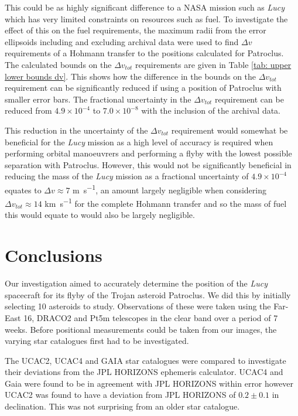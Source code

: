 \documentclass[10pt, twocolumn]{revtex4}    %
\newcommand{\Lucy}{\textit{Lucy }}
\begin{document}
This could be as highly significant difference to a NASA mission such as \textit{Lucy} which has very limited constraints on resources such as fuel. To investigate the effect of this on the fuel requirements, the maximum radii from the error ellipsoids including and excluding archival data were used to find $\Delta v$ requirements of a Hohmann transfer to the positions calculated for Patroclus. The calculated bounds on the $\Delta v_{tot}$ requirements are given in Table \ref{tab: upper lower bounds dv}. This shows how the difference in the bounds on the $\Delta v_{tot}$ requirement can be significantly reduced if using a position of Patroclus with smaller error bars. The fractional uncertainty in the $\Delta v_{tot}$ requirement can be reduced from $4.9 \times 10^{-4}$ to $7.0 \times 10^{-8}$ with the inclusion of the archival data. 

This reduction in the uncertainty of the $\Delta v_{tot}$ requirement would somewhat be beneficial for the \Lucy mission as a high level of accuracy is required when performing orbital manoeuvrers and performing a flyby with the lowest possible separation with Patroclus. However, this would not be significantly beneficial in reducing the mass of the \Lucy mission as a fractional uncertainty of $4.9 \times 10^{-4}$ equates to $\Delta v \approx 7$ \si{\metre\per\second}, an amount largely negligible when considering $\Delta v_{tot} \approx 14$ \si{\km\per\s} for the complete Hohmann transfer and so the mass of fuel this would equate to would also be largely negligible.

\section{Conclusions}

Our investigation aimed to accurately determine the position of the \Lucy spacecraft for its flyby of the Trojan asteroid Patroclus. We did this by initially selecting 10 asteroids to study. Observations of these were taken using the Far-East 16, DRACO2 and Pt5m telescopes in the clear band over a period of 7 weeks. Before positional measurements could be taken from our images, the varying star catalogues first had to be investigated.

The UCAC2, UCAC4 and GAIA star catalogues were compared to investigate their deviations from the JPL HORIZONS ephemeris calculator. UCAC4 and Gaia were found to be in agreement with JPL HORIZONS within error however UCAC2 was found to have a deviation from JPL HORIZONS of $0.2 \pm 0.1$ in declination. This was not surprising from an older star catalogue.
\end{document}
